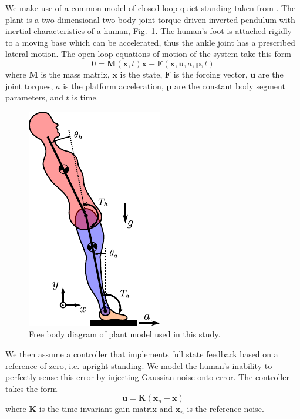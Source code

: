 \documentclass[11pt,a4paper,twocolumn]{article}
\begin{document}
We make use of a common model of closed loop quiet standing taken from
\cite{Park2004}. The plant is a two dimensional two body joint torque driven
inverted pendulum with inertial characteristics of a human,
Fig.~\ref{fig:free-body-diagram}. The human's foot is attached rigidly to a
moving base which can be accelerated, thus the ankle joint has a prescribed
lateral motion. The open loop equations of motion of the system take this form
%
\begin{equation}
  0 = \mathbf{M}(\mathbf{x}, t) \dot{\mathbf{x}} - \mathbf{F}(\mathbf{x},
    \mathbf{u}, a, \mathbf{p}, t)
\end{equation}
%
where $\mathbf{M}$ is the mass matrix, $\mathbf{x}$ is the state, $\mathbf{F}$
is the forcing vector, $\mathbf{u}$ are the joint torques, $a$ is the platform
acceleration, $\mathbf{p}$ are the constant body segment parameters, and $t$ is
time.
%
\begin{figure}
  \centering
  \includegraphics{figures/free-body-diagram.pdf}
  \caption{Free body diagram of plant model used in this study.}
  \label{fig:free-body-diagram}
\end{figure}

We then assume a controller that implements full state feedback based on a
reference of zero, i.e. upright standing. We model the human's inability to
perfectly sense this error by injecting Gaussian noise onto error. The
controller takes the form
%
\begin{equation}
  \mathbf{u} = \mathbf{K} (\mathbf{x}_n - \mathbf{x})
\end{equation}
%
where $\mathbf{K}$ is the time invariant gain matrix and $\mathbf{x}_n$ is the
reference noise.
\end{document}
